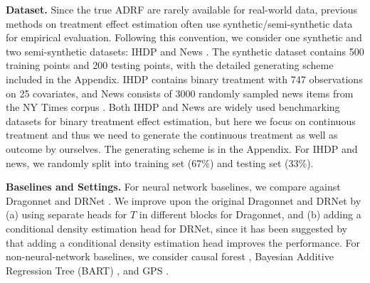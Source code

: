 \textbf{Dataset.} 
Since the true ADRF are rarely available for real-world data, previous methods on treatment effect estimation often use synthetic/semi-synthetic data for empirical evaluation. Following this convention, we consider one synthetic and two semi-synthetic datasets: IHDP \citep{hill2011bayesian} and News \citep{newman2008bag}. The synthetic dataset contains 500 training points and 200 testing points, with the detailed generating scheme included in the Appendix. IHDP contains binary treatment with 747 observations on 25 covariates, and News consists of 3000 randomly sampled news items from the NY Times corpus \citep{newman2008bag}.
Both IHDP and News are widely used benchmarking datasets for binary treatment effect estimation, but here we focus on continuous treatment and thus we need to generate the continuous treatment as well as outcome by ourselves. The generating scheme is in the Appendix. For IHDP and news,  we randomly split into training set (67\%) and testing set (33\%). 


\textbf{Baselines and Settings.}
For neural network baselines, we compare against Dragonnet \citep{shi2019adapting} and DRNet \citep{schwab2019learning}. 
We improve upon the original Dragonnet and DRNet by (a) using separate heads for $T$ in different blocks for Dragonnet, and (b) adding a conditional density estimation head for DRNet, since it has been suggested by \citet{shi2019adapting} that adding a conditional density estimation head improves the performance.
For non-neural-network baselines, we consider causal forest  \citep{wager2018estimation}, Bayesian Additive Regression Tree (BART) \citep{chipman2010bart}, and GPS \citep{imbens2000role}. 

